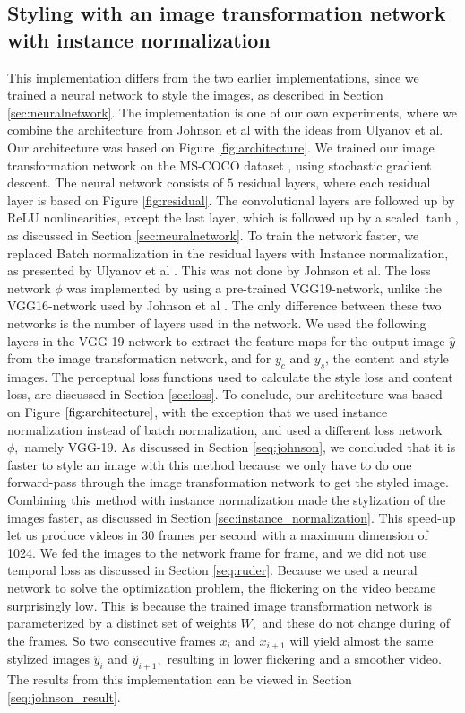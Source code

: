 \subsection{Styling with an image transformation network with instance normalization}
\label{seq:johnson_method}
This implementation differs from the two earlier implementations, since we trained a neural network to style the images, as described in Section \ref{sec:neuralnetwork}. The implementation is one of our own experiments, where we combine the architecture from Johnson et al \cite{Johnson:1} with the ideas from Ulyanov et al\cite{Ulyanov:1}. Our architecture was based on Figure \ref{fig:architecture}. We trained our image transformation network on the MS-COCO dataset \cite{Coco:1}, using stochastic gradient descent. The neural network consists of $5$ residual layers, where each residual layer is based on Figure \ref{fig:residual}. The convolutional layers are followed up by ReLU nonlinearities, except the last layer, which is followed up by a scaled $\tanh$, as discussed in Section \ref{sec:neuralnetwork}. To train the network faster, we replaced Batch normalization in the residual layers with Instance normalization, as presented by Ulyanov et al \cite{Ulyanov:1}. This was not done by Johnson et al.\newline\newline 
The loss network $\phi$ was implemented by using a pre-trained VGG19-network, unlike the VGG16-network used by Johnson et al \cite{Johnson:1}. The only difference between these two networks is the number of layers used in the network. We used the following layers in the VGG-19 network to extract the feature maps for the output image $\hat{y}$ from the image transformation network, and for $y_c$ and $y_s$, the content and style images. The perceptual loss functions used to calculate the style loss and content loss, are discussed in Section \ref{sec:loss}.\newline\newline
To conclude, our architecture was based on Figure $\ref{fig:architecture}$, with the exception that we used instance normalization instead of batch normalization, and used a different loss network $\phi,$ namely VGG-19. As discussed in Section \ref{seq:johnson}, we concluded that it is faster to style an image with this method because we only have to do one forward-pass through the image transformation network to get the styled image. Combining this method with instance normalization made the stylization of the images faster, as discussed in Section \ref{sec:instance_normalization}. This speed-up let us produce videos in $30$ frames per second with a maximum dimension of 1024. We fed the images to the network frame for frame, and we did not use temporal loss as discussed in Section \ref{seq:ruder}. Because we used a neural network to solve the optimization problem, the flickering on the video became surprisingly low. This is because the trained image transformation network is parameterized by a distinct set of weights $W,$ and these do not change during of the frames. So two consecutive frames $x_i$ and $x_{i+1}$ will yield almost the same stylized images $\hat{y}_i$ and $\hat{y}_{i+1},$ resulting in lower flickering and a smoother video. The results from this implementation can be viewed in Section \ref{seq:johnson_result}.